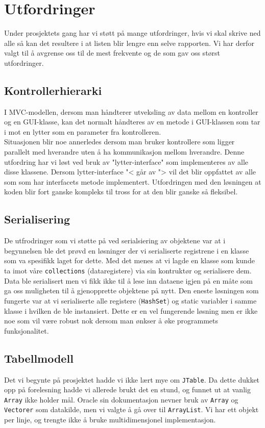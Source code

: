 \section{Utfordringer}
Under prosjektets gang har vi støtt på mange utfordringer, hvis vi skal skrive ned alle så kan det resultere i at listen blir lengre enn selve rapporten. Vi har derfor valgt til å avgrense oss til de mest frekvente og de som gav oss størst utfordringer.

\subsection{Kontrollerhierarki}
I MVC-modellen, dersom man håndterer utveksling av data mellom en kontroller og en GUI-klasse, kan det normalt håndteres av en metode i GUI-klassen som tar i mot en lytter som en parameter fra kontrolleren. \\
Situasjonen blir noe annerledes dersom man bruker kontrollere som ligger parallelt med hverandre uten å ha kommunikasjon mellom hverandre. Denne utfordring har vi løst ved bruk av "lytter-interface" som implementeres av alle disse klassene. Dersom lytter-interface "< går av "> vil det blir oppfattet av alle som som har interfacets metode implementert. Utfordringen med den løsningen at koden blir fort ganske kompleks til tross for at den blir ganske så fleksibel.

\subsection{Serialisering}
De utfrodringer som vi støtte på ved serialsiering av objektene var at i begynnelsen ble det prøvd en løsninger der vi serialiserte registrene i en klasse som va spesifikk laget for dette. Med det menes at vi lagde en klasse som kunde ta imot våre \texttt{collections} (dataregistere) via sin kontruktør og serialisere dem. Data ble serialisert men vi fikk ikke til å lese inn dataene igjen på en måte som ga oss muligheten til å gjenopprette objektene på nytt. Den eneste løsningen som fungerte var at vi serialiserte alle registere (\texttt{HashSet}) og static variabler i samme klasse i hvilken de ble instansiert. Dette er en vel fungerende løsning men er ikke noe som vil være robust nok dersom man ønkser å øke programmets funksjonalitet. 


\subsection{Tabellmodell}
Det vi begynte på prosjektet hadde vi ikke lært mye om \texttt{JTable}. Da dette dukket opp på forelesning hadde vi allerede brukt det en stund, og funnet ut at vanlig \texttt{Array} ikke holder mål. Oracle sin dokumentasjon nevner bruk av \texttt{Array} og \texttt{Vectorer} som datakilde, men vi valgte å gå over til \texttt{ArrayList}. Vi har ett objekt per linje, og trengte ikke å bruke multidimensjonel implementasjon.


